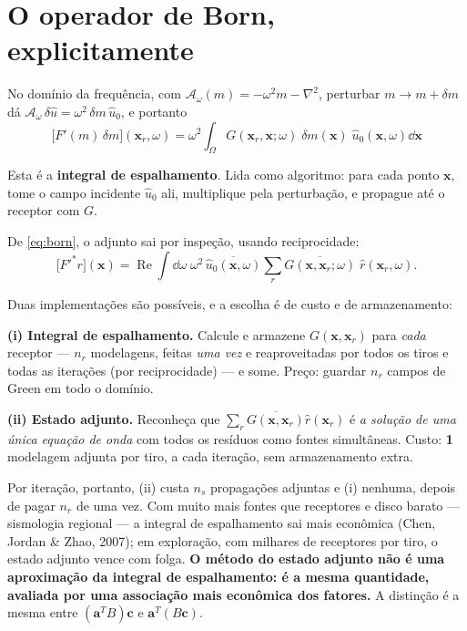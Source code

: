 \documentclass[11pt,a4paper,oneside]{report}
\begin{document}
\section{O operador de Born, explicitamente}

No dom\'inio da frequ\^encia, com $\mathcal{A}_\omega(m) = -\omega^{2}m -
\nabla^{2}$, perturbar $m \to m+\delta m$ d\'a
$\mathcal{A}_\omega\,\delta\hat u = \omega^{2}\,\delta m\,\hat u_0$, e
portanto
\begin{equation}
\boxed{\;
\bigl[F'(m)\,\delta m\bigr](\mathbf{x}_r,\omega)
 = \omega^{2}\!\int_{\Omega} G(\mathbf{x}_r,\mathbf{x};\omega)\;
   \delta m(\mathbf{x})\;\hat u_0(\mathbf{x},\omega)\dd\mathbf{x} \;}
\label{eq:born}
\end{equation}

Esta \'e a \textbf{integral de espalhamento}. Lida como algoritmo: para cada
ponto $\mathbf{x}$, tome o campo incidente $\hat u_0$ ali, multiplique pela
perturba\c{c}\~ao, e propague at\'e o receptor com $G$.

\begin{teoria}
De \eqref{eq:born}, o adjunto sai por inspe\c{c}\~ao, usando reciprocidade:
\begin{equation}
\bigl[F'^{*}r\bigr](\mathbf{x})
 = \operatorname{Re}\int\!\dd\omega\;\omega^{2}\,
   \overline{\hat u_0(\mathbf{x},\omega)}
   \sum_r \overline{G(\mathbf{x},\mathbf{x}_r;\omega)}\;\hat r(\mathbf{x}_r,\omega).
\label{eq:adj_freq}
\end{equation}

Duas implementa\c{c}\~oes s\~ao poss\'iveis, e a escolha \'e de custo e de
armazenamento:

\textbf{(i) Integral de espalhamento.} Calcule e armazene
$G(\mathbf{x},\mathbf{x}_r)$ para \emph{cada} receptor --- $n_r$
modelagens, feitas \emph{uma vez} e reaproveitadas por todos os tiros e todas
as itera\c{c}\~oes (por reciprocidade) --- e some. Pre\c{c}o: guardar $n_r$
campos de Green em todo o dom\'inio.

\textbf{(ii) Estado adjunto.} Reconhe\c{c}a que
$\sum_r \overline{G(\mathbf{x},\mathbf{x}_r)}\hat r(\mathbf{x}_r)$ \'e
\emph{a solu\c{c}\~ao de uma \'unica equa\c{c}\~ao de onda} com todos os
res\'iduos como fontes simult\^aneas. Custo: \textbf{1} modelagem adjunta por
tiro, a cada itera\c{c}\~ao, sem armazenamento extra.

Por itera\c{c}\~ao, portanto, (ii) custa $n_s$ propaga\c{c}\~oes adjuntas e
(i) nenhuma, depois de pagar $n_r$ de uma vez. Com muito mais fontes que
receptores e disco barato --- sismologia regional --- a integral de
espalhamento sai mais econ\^omica (Chen, Jordan \& Zhao, 2007); em
explora\c{c}\~ao, com milhares de receptores por tiro, o estado adjunto vence
com folga. \textbf{O
m\'etodo do estado adjunto n\~ao \'e uma aproxima\c{c}\~ao da integral de
espalhamento: \'e a mesma quantidade, avaliada por uma associa\c{c}\~ao mais
econ\^omica dos fatores.} A distin\c{c}\~ao \'e a mesma entre
$(\mathbf{a}^{T}B)\mathbf{c}$ e $\mathbf{a}^{T}(B\mathbf{c})$.
\end{teoria}
\end{document}
